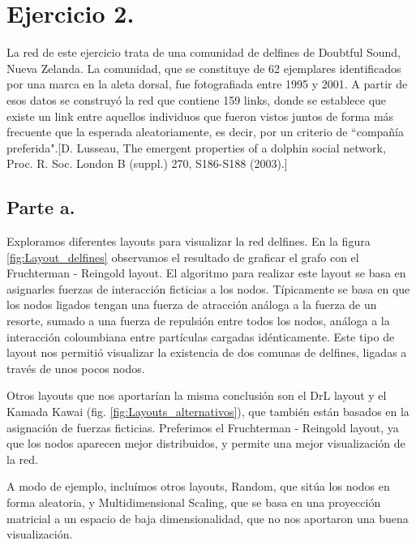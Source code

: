 
\section{Ejercicio 2.}

La red de este ejercicio trata de una comunidad de delfines de Doubtful Sound, Nueva Zelanda. La comunidad, que se constituye de 62 ejemplares identificados por una marca en la aleta dorsal, fue fotografiada entre 1995 y 2001. A partir de esos datos se construyó la red que contiene 159 links, donde se establece que existe un link entre aquellos individuos que fueron vistos juntos de forma más frecuente que la esperada aleatoriamente, es decir, por un criterio de ``compañía preferida".[D. Lusseau, The emergent properties of a dolphin social network, Proc. R. Soc. London B (suppl.) 270, S186-S188 (2003).]

\subsection{Parte a.}

\par Exploramos diferentes layouts para visualizar la red delfines.
En la figura \ref{fig:Layout_delfines} observamos el resultado de graficar
el grafo con el Fruchterman - Reingold layout. El algoritmo para realizar este layout se basa en asignarles fuerzas de interacción ficticias a los nodos. Típicamente se basa en que los nodos ligados tengan una fuerza de atracción análoga a la fuerza de un resorte, sumado a una fuerza de repulsión entre todos los nodos, análoga a la interacción coloumbiana entre partículas cargadas idénticamente. Este tipo de layout nos permitió visualizar la existencia de dos comunas de delfines, ligadas a través de unos pocos nodos.
\par Otros layouts que nos aportarían la misma conclusión son el DrL layout y el Kamada Kawai (fig. \ref{fig:Layouts_alternativos}), que también están basados en la asignación de fuerzas ficticias. Preferimos el Fruchterman - Reingold layout, ya que los nodos aparecen mejor distribuidos, y permite una mejor visualización de la red.
\par A modo de ejemplo, incluímos otros layouts, Random, que sitúa los nodos en forma aleatoria, y Multidimensional Scaling, que se basa en una proyección matricial a un espacio de baja dimensionalidad, que no nos aportaron una buena visualización.

